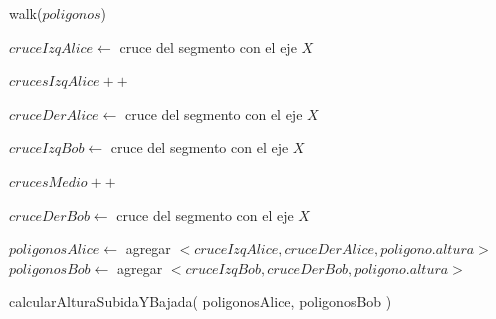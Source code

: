 \begin{algorithm}[H]
\linesnumbered
\caption{walk($poligonos$)}
\vspace{0.4cm}
 {
     {
         {
             {
                $cruceIzqAlice \gets$ cruce del segmento con el eje $X$
                
                $crucesIzqAlice++$
            }
             {
                $cruceDerAlice \gets$ cruce del segmento con el eje $X$
                
                $cruceIzqBob \gets$ cruce del segmento con el eje $X$
                
                $crucesMedio++$
            }
             {
                $cruceDerBob \gets$ cruce del segmento con el eje $X$
            }
        }
    }
    
     {
        $poligonosAlice \gets$ agregar $<cruceIzqAlice, cruceDerAlice, poligono.altura>$
    }
     {
        $poligonosBob \gets$ agregar $<cruceIzqBob, cruceDerBob, poligono.altura>$
    }
}

calcularAlturaSubidaYBajada( poligonosAlice, poligonosBob )
\end{algorithm}


